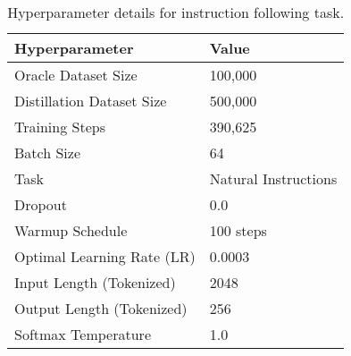 \begin{table}[h!]
\centering
\caption{Hyperparameter details for instruction following task.}
\begin{tabular}{@{}ll@{}}
\toprule
\textbf{Hyperparameter} & \textbf{Value} \\ \midrule
Oracle Dataset Size     & 100,000       \\
Distillation Dataset Size & 500,000     \\
Training Steps          & 390,625         \\
Batch Size              & 64            \\
Task                    & Natural Instructions  \\
Dropout                 & 0.0            \\
Warmup Schedule         & 100 steps      \\
Optimal Learning Rate (LR)  & 0.0003         \\
Input Length (Tokenized)    & 2048           \\
Output Length (Tokenized)   & 256           \\
Softmax Temperature     & 1.0      \\ \bottomrule
\end{tabular}
\label{tab:hyperparams_natural_instructions}
\end{table}

